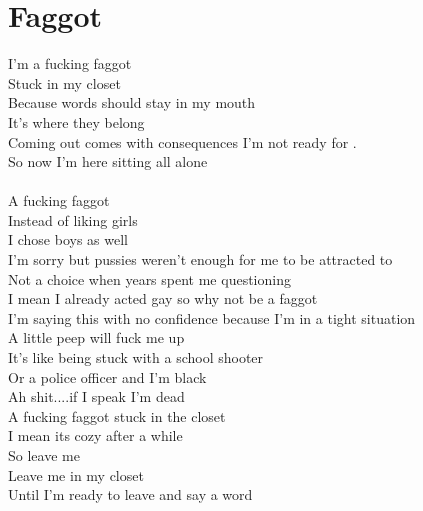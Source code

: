 \documentclass[12pt, b5paper, oneside]{book}
\begin{document}
\section{Faggot}
I'm a fucking faggot
\\Stuck in my closet
\\Because words should stay in my mouth
\\It's where they belong
\\Coming out comes with consequences I'm not ready for .
\\So now I'm here sitting all alone
%
\\\\A fucking faggot
\\Instead of liking girls
\\I chose boys as well
\\I'm sorry but pussies weren't enough for me to be attracted to
\\Not a choice when years spent me questioning
\\I mean I already acted gay so why not be a faggot
\\I'm saying this with no confidence because I'm in a tight situation
\\A little peep will fuck me up
\\It's like being stuck with a school shooter
\\Or a police officer and I'm black
\\Ah shit....if I speak I'm dead
\\A fucking faggot stuck in the closet
\\I mean its cozy after a while
\\So leave me
\\Leave me in my closet
\\Until I'm ready to leave and say a word 
\newpage
\end{document}
